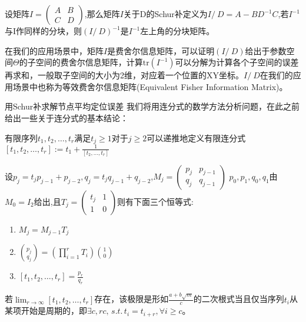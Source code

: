 \begin{definition}
    设矩阵$I=\left(\begin{array}{cc}A&B\\C&D\end{array}\right)$,那么矩阵$I$关于D的Schur补定义为$
    I/\ D=A-BD^{-1}C$,若$I^{-1}$与I作同样的分块，则$(I/\ D)^{-1}$是$I^{-1}$左上角的分块矩阵。
\end{definition}
\begin{remark}
	在我们的应用场景中，矩阵$I$是费舍尔信息矩阵，可以证明$(I/\ D)$给出于参数空间$\Theta$的子空间的费舍尔信息矩阵，计算$\text{tr}(I^{-1})$可以分解为计算各个子空间的误差再求和，一般取子空间的大小为2维，对应着一个位置的XY坐标。$I/\ D$在我们的应用场景中也称为等效费舍尔信息矩阵(Equivalent Fisher Information Matrix)。
\end{remark}
{用Schur补求解节点平均定位误差}
我们将用连分式的数学方法分析问题，在此之前给出一些关于连分式的基本结论\cite{ContinuedFraction}：
\begin{definition}
  有限序列$t_1,t_2,\dots,t_r$满足$t_j\geq 1$对于$j\geq2$可以递推地定义有限连分式$[t_1,t_2,\dots,t_r]:=t_1+\frac{1}{[t_2,\dots,t_r]}$
\end{definition}
\begin{theorem}\label{thm:basic}
  设$p_j=t_j p_{j-1}+p_{j-2},q_j=t_j q_{j-1}+q_{j-2}$,$M_j=(\begin{matrix}p_j&p_{j-1}\\q_j&q_{j-1}\end{matrix})$
  $p_0,p_1,q_0,q_1$由$M_0=I_2$给出,且$T_j=(\begin{matrix}t_j&1\\1&0\end{matrix})$则有下面三个恒等式:
  \begin{enumerate}
    \item $M_j=M_{j-1}T_j$
    \item $\binom{p_j}{q_j}=(\prod_{i=1}^r T_i )\binom{1}{0}$
    \item $[t_1,t_2,\dots,t_r]=\frac{p_r}{q_r}$
  \end{enumerate}
\end{theorem}
\begin{theorem}\label{theorem:quadratic_cyclic}
若$\lim_{r\to \infty}[t_1,t_2,\dots,t_r]$存在，该极限是形如$\frac{a+b\sqrt{m}}{c}$的二次根式当且仅当序列$t_i$从某项开始是周期的，即$\exists c,rc,\,s.t.\, t_{i}=t_{i+r},\forall i\geq c$。
\end{theorem}
